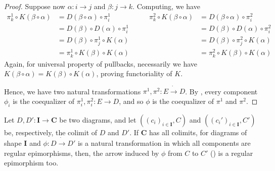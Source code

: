 \documentclass[runningheads,envcountsect]{lipics-v2021}
\newcommand{\cat}[1]{\ensuremath{\mathbf{#1}}}
\begin{document}
\begin{proof}
        Suppose now $\alpha : i \to j$ and $\beta: j \to k$. Computing, we have
        \[
            \begin{split}
                \pi_k^1 \circ K(\beta \circ \alpha) &= D(\beta \circ \alpha) \circ \pi_i^1 \\
                                                    &= D(\beta) \circ D(\alpha) \circ \pi_i^1 \\
                                                    &= D(\beta) \circ \pi_j^1 \circ K(\alpha) \\
                                                    &= \pi_k^1 \circ K(\beta) \circ K(\alpha)
            \end{split} \qquad
            \begin{split}
                \pi_k^2 \circ K(\beta \circ \alpha) &= D(\beta \circ \alpha) \circ \pi_i^2 \\
                                                    &= D(\beta) \circ D(\alpha) \circ \pi_i^2 \\
                                                    &= D(\beta) \circ \pi_j^2 \circ K(\alpha) \\
                                                    &= \pi_k^2 \circ K(\beta) \circ K(\alpha)
            \end{split}
        \]
        Again, for universal property of pullbacks, necessarily we have $K(\beta \circ \alpha) = K(\beta) \circ K(\alpha)$, proving functoriality of $K$.
   
    
     Hence, we have two natural transformations $\pi^1, \pi^2 : E \dot\to D$. By , every component $\phi_i$ is the coequalizer of $\pi_i^1, \pi_i^2: E \to D$, and so $\phi$ is the coequalizer of $\pi^1$ and $\pi^2$.   
\end{proof}

\begin{lemma}\label{lemma:nat_trans_reg_epi_canonical_arrow_reg_epi}
    Let $D, D': \cat{I \to C}$ be two diagrams, and let $((c_i)_{i \in \cat I}, C)$ and $((c_i')_{i\in \cat I}, C')$ be, respectively, the colimit of $D$ and $D'$. If $\cat C$ has all colimits, for diagrams of shape $\cat I$ and $\phi: D \dot\to D'$ is a natural transformation in which all components are regular epimorphisms, then, the arrow induced by $\phi$ from $C$ to $C'$ () is a regular epimorphism too.
\end{lemma}
\end{document}
